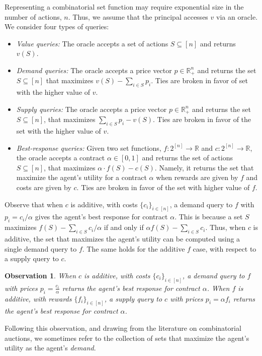 \documentclass[11pt]{article}
\newtheorem{observation}{Observation}
\newcommand{\reals}{\mathbb{R}}
\begin{document}
Representing a combinatorial set function may require exponential size in the number of actions, $n$. Thus, we assume that the principal accesses $v$ via an oracle. We consider four types of queries:
\begin{itemize}
    \setlength\itemsep{-0.25em}
    \item \emph{Value queries:} The oracle accepts a set of actions $S \subseteq [n]$ and returns $v(S)$.
    \item \emph{Demand queries:} The oracle accepts a price vector $p \in \reals^n_{+}$ and returns the set $S \subseteq [n]$ that maximizes 
    $v(S) - \sum_{i \in S} p_i$.
    Ties are broken in favor of set with the higher value of $v$.
    \item \emph{Supply queries:} The oracle accepts a price vector $p \in \reals^n_{+}$ and returns the set $S \subseteq [n]$, that maximizes 
    $\sum_{i \in S} p_i - v(S)$.
    Ties are broken in favor of the set with the higher value of $v$.
    \item \emph{Best-response queries:} Given two set functions, $f:2^{[n]} \to \reals$ and $c:2^{[n]} \to \reals$, the oracle accepts a contract $\alpha \in [0,1]$ and returns the set of actions $S \subseteq [n]$, that maximizes $\alpha \cdot f(S)-c(S)$. Namely, it returns the set that maximize the agent's utility for a contract $\alpha$ when rewards are given by $f$ and costs are given by $c$. Ties are broken in favor of the set with higher value of $f$.
\end{itemize}
Observe that when $c$ is additive, with costs $\{c_i\}_{i \in [n]}$, a demand query to $f$ with $p_i = c_i / \alpha$ gives the agent's best response for contract $\alpha$. This is because a set $S$ maximizes $f(S) - \sum_{i \in S}c_i/\alpha$ if and only if $\alpha f(S) - \sum_{i \in S} c_i$. 
Thus, when $c$ is additive, the set that maximizes the agent's utility can be computed using a single demand query to $f$. 
The same holds for the additive $f$ case, with respect to a supply query to $c$.

\begin{observation}
    When $c$ is additive, with costs $\{c_i\}_{i \in [n]}$, a demand query to $f$ with prices $p_i = \frac{c_i}{\alpha}$ returns the agent's best response for contract $\alpha$.
    When $f$ is additive, with rewards $\{f_i\}_{i \in [n]}$, a supply query to $c$ with prices $p_i =  \alpha f_i$ returns the agent's best response for contract $\alpha$.
\end{observation}
Following this observation, and drawing from the literature on combinatorial auctions, we sometimes refer to the collection of sets that maximize the agent's utility as the agent's \emph{demand}.
\end{document}

